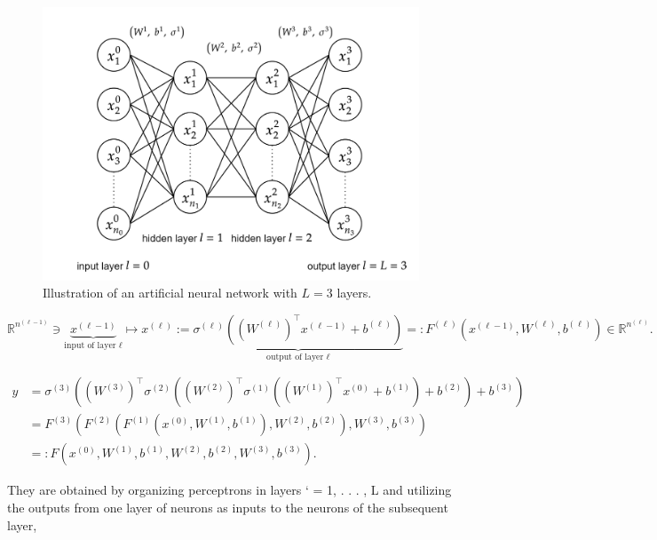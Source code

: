 \begin{figure}[H]
    \begin{center}
        \includegraphics[scale=0.3]{img/diagram-20220206.png}
    \end{center}
    \caption{Illustration of an artificial neural network with $L=3$ layers.}
    \label{fig5}
\end{figure}

\begin{equation*}
    \mathbb{R}^{n^{(\ell-1)}} \ni \underbrace{x^{(\ell-1)}}_{\text {input of layer } \ell} \mapsto x^{(\ell)}:=\underbrace{\sigma^{(\ell)}\left(\left(W^{(\ell)}\right)^{\top} x^{(\ell-1)}+b^{(\ell)}\right)}_{\text {output of layer } \ell}=: F^{(\ell)}\left(x^{(\ell-1)}, W^{(\ell)}, b^{(\ell)}\right) \in \mathbb{R}^{n^{(\ell)}} .
\end{equation*}


\begin{equation*}
    \begin{aligned}
        y &=\sigma^{(3)}\left(\left(W^{(3)}\right)^{\top} \sigma^{(2)}\left(\left(W^{(2)}\right)^{\top} \sigma^{(1)}\left(\left(W^{(1)}\right)^{\top} x^{(0)}+b^{(1)}\right)+b^{(2)}\right)+b^{(3)}\right) \\
        &=F^{(3)}\left(F^{(2)}\left(F^{(1)}\left(x^{(0)}, W^{(1)}, b^{(1)}\right), W^{(2)}, b^{(2)}\right), W^{(3)}, b^{(3)}\right) \\
        &=: F\left(x^{(0)}, W^{(1)}, b^{(1)}, W^{(2)}, b^{(2)}, W^{(3)}, b^{(3)}\right) .
    \end{aligned}
\end{equation*}

They are obtained by organizing perceptrons in layers ` = 1, . . . , L and utilizing the outputs from one layer of neurons as inputs to the neurons of the subsequent layer,


